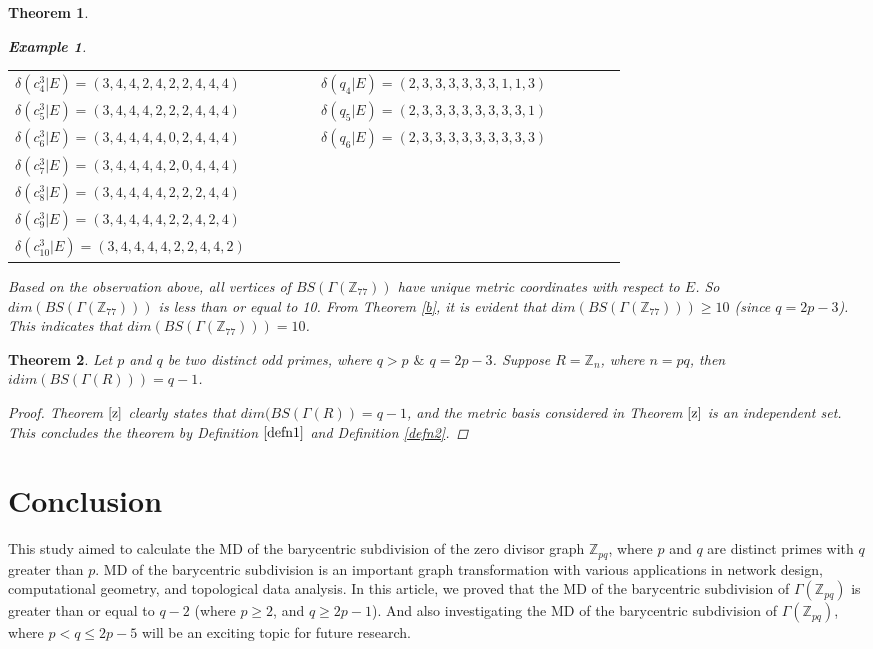 \documentclass[]{interact}
\theoremstyle{plain}%
\newtheorem{theorem}{Theorem}[section]
\theoremstyle{definition}
\newtheorem{example}{Example}[section]
\theoremstyle{remark}
\begin{document}
\begin{theorem}
\begin{example}
\begin{table}[h!]
\begin{tabular}{|p{0.4\linewidth}|p{0.4\linewidth}|}
    $\delta(c^3 _4|E)=(3,4,4,2,4,2,2,4,4,4)$ &$ \delta(q_4|E)=(2,3,3,3,3,3,3,1,1,3)$\\
     $\delta(c^3 _5|E)=(3,4,4,4,2,2,2,4,4,4)$ &$ \delta(q_5|E)=(2,3,3,3,3,3,3,3,3,1)$\\
    $\delta(c^3 _6|E)=(3,4,4,4,4,0,2,4,4,4)$  & $ \delta(q_6|E)=(2,3,3,3,3,3,3,3,3,3)$\\
     $\delta(c^3_7|E)=(3,4,4,4,4,2,0,4,4,4)$  & \\
      $\delta(c^3_8|E)=(3,4,4,4,4,2,2,2,4,4)$&  \\
      $\delta(c^3_9|E)=(3,4,4,4,4,2,2,4,2,4)$&  \\
     $\delta(c^3_{10}|E)=(3,4,4,4,4,2,2,4,4,2)$ &  \\
      \hline
    \end{tabular}
    \label{tab:example3}
\end{table}
\end{example}
\noindent Based on the observation above, all vertices of $BS(\Gamma(\mathbb{Z}_{77}))$ have unique metric coordinates with respect to $E$. So $dim(BS(\Gamma(\mathbb{Z}_{77})))$ is less than or equal to 10. From Theorem \ref{b}, it is evident that $dim(BS(\Gamma(\mathbb{Z}_{77})))\geq 10$ (since $q=2p-3$). This indicates that $dim(BS(\Gamma(\mathbb{Z}_{77})))=10$.\\
 \end{theorem}
 \begin{theorem}
Let $p$ and $q$ be two distinct odd primes, where $q>p$ $\&$ $q = 2p-3$. Suppose $R=\mathbb{Z}_n$, where $n=pq$, then
$idim(BS(\Gamma(R))
)=q-1$.
\begin{proof}
Theorem $\ref{z}$ clearly states that $dim(BS(\Gamma(R))=q-1$, and the metric basis considered in Theorem $\ref{z}$ is an independent set. This concludes the theorem by Definition $\ref{defn1}$ and Definition \ref{defn2}.
\end{proof}
\end{theorem}
\section {Conclusion}
 \noindent This study aimed to calculate the MD of the barycentric subdivision of the zero divisor graph $\mathbb {Z}_{pq}$, where $p$ and $q$ are distinct primes with $q$ greater than $p$. MD of the barycentric subdivision is an important graph transformation with various applications in network design, computational geometry, and topological data analysis. In this article, we proved that the MD of the barycentric subdivision of $\Gamma(\mathbb{Z}_{pq})$ is greater than or equal to $q-2$ (where $p\geq 2$, and $q\geq 2p-1$). And also investigating the MD of the barycentric subdivision of $\Gamma(\mathbb{Z}_{pq})$, where $p< q \leq 2p-5$ will be an exciting topic for future research.\\
\end{document}
